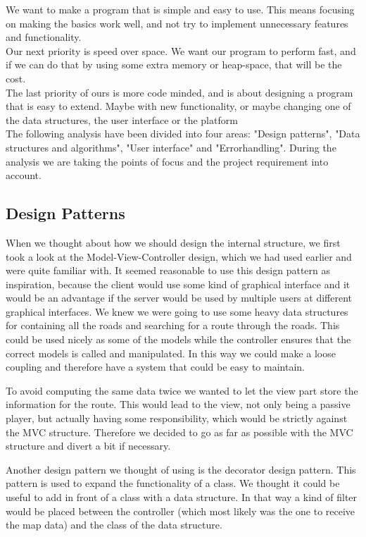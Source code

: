 \documentclass[a4paper,10pt,titlepage]{article}
\begin{document}
We want to make a program that is simple and easy to use. This means focusing on making the basics work well, and not try to implement unnecessary features and functionality.\\

Our next priority is speed over space. We want our program to perform fast, and if we can do that by using some extra     memory or heap-space, that will be the cost.\\

The last priority of ours is more code minded, and is about designing a program that is easy to extend. Maybe with new functionality, or maybe changing one of the data structures, the user interface or the platform\\

The following analysis have been divided into four areas: "Design patterns", "Data structures and algorithms", "User interface" and "Errorhandling". During the analysis we are taking the points of focus and the project requirement into account.


			\subsection{Design Patterns}
			When we thought about how we should design the internal structure, we first took a look at the Model-View-Controller design, which we had used earlier and were quite familiar with. It seemed reasonable to use this design pattern as inspiration, because the client would use some kind of graphical interface and it would be an advantage if the server would be used by multiple users at different graphical interfaces. We knew we were going to use some heavy data structures for containing all the roads and searching for a route through the roads. This could be used nicely as some of the models while the controller ensures that the correct models is called and manipulated. In this way we could make a loose coupling and therefore have a system that could be easy to maintain.

To avoid computing the same data twice we wanted to let the view part store the information for the route. This would lead to the view, not only being a passive player, but actually having some responsibility, which would be strictly against the MVC structure. Therefore we decided to go as far as possible with the MVC structure and divert a bit if necessary.

Another design pattern we thought of using is the decorator design pattern. This pattern is used to expand the functionality of a class. We thought it could be useful to add in front of a class with a data structure. In that way a kind of filter would be placed between the controller (which most likely was the one to receive the map data) and the class of the data structure.
\end{document}
